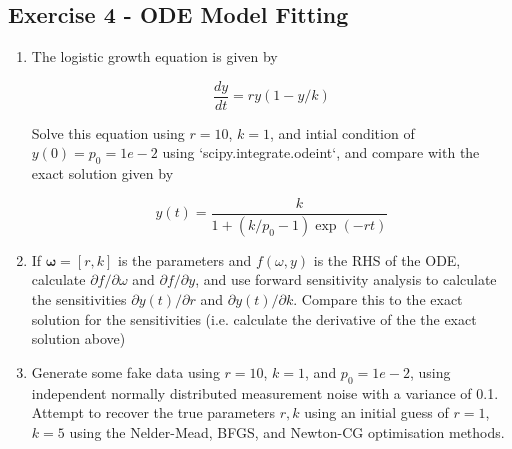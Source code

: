 \documentclass[a4paper]{article}
\begin{document}
\subsection*{Exercise 4 - ODE Model Fitting}

\begin{enumerate}[label=\Alph*]
    \item The logistic growth equation is given by

      $$ \frac{dy}{dt} = r y (1 - y/k) $$

      Solve this equation using $r = 10$, $k = 1$, and intial condition of $y(0) = p_0
      = 1e-2$ using `scipy.integrate.odeint`, and compare with the exact solution
      given by

      $$ y(t) = \frac{k}{1 + (k/p_0 - 1) \exp(-r t)} $$

  \item If $\mathbf{\omega} = [r, k] $ is the parameters and $f(\omega, y)$ is the RHS
    of the ODE, calculate $\partial f/ \partial \omega$ and $\partial f/ \partial y$,
    and use forward sensitivity analysis to calculate the sensitivities $\partial y(t) /
    \partial r$ and $\partial y(t) / \partial k$. Compare this to the exact solution for
    the sensitivities (i.e. calculate the derivative of the the exact solution above)

  \item Generate some fake data using $r = 10$, $k = 1$, and $p_0 = 1e-2$, using
    independent normally distributed measurement noise with a variance of 0.1.  Attempt
    to recover the true parameters $r,k$ using an initial guess of $r=1$, $k=5$ using
    the Nelder-Mead, BFGS, and Newton-CG optimisation methods. 

\end{enumerate}
\end{document}
